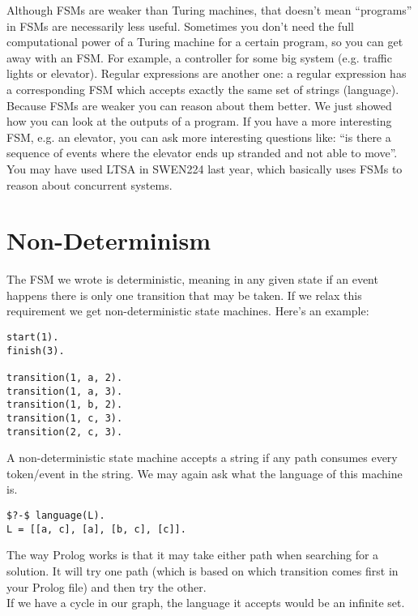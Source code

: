 \documentclass[a4paper,12pt]{article}
\begin{document}
\noindent
Although FSMs are weaker than Turing machines, that doesn't mean ``programs'' in FSMs are necessarily less useful. Sometimes you don't need the full computational power of a Turing machine for a certain program, so you can get away with an FSM. For example, a controller for some big system (e.g. traffic lights or elevator). Regular expressions are another one: a regular expression has a corresponding FSM which accepts exactly the same set of strings (language). \\

\noindent
Because FSMs are weaker you can reason about them better. We just showed how you can look at the outputs of a program. If you have a more interesting FSM, e.g. an elevator, you can ask more interesting questions like: ``is there a sequence of events where the elevator ends up stranded and not able to move''. You may have used LTSA in SWEN224 last year, which basically uses FSMs to reason about concurrent systems.

\section{Non-Determinism}

The FSM we wrote is deterministic, meaning in any given state if an event happens there is only one transition that may be taken. If we relax this requirement we get non-deterministic state machines. Here's an example:

\begin{lstlisting}
start(1).
finish(3).

transition(1, a, 2).
transition(1, a, 3).
transition(1, b, 2).
transition(1, c, 3).
transition(2, c, 3).
\end{lstlisting}

\noindent
A non-deterministic state machine accepts a string if any path consumes every token/event in the string. We may again ask what the language of this machine is.

\begin{lstlisting}
$?-$ language(L).
L = [[a, c], [a], [b, c], [c]].
\end{lstlisting}

\noindent
The way Prolog works is that it may take either path when searching for a solution. It will try one path (which is based on which transition comes first in your Prolog file) and then try the other. \\

\noindent
If we have a cycle in our graph, the language it accepts would be an infinite set.
\end{document}
